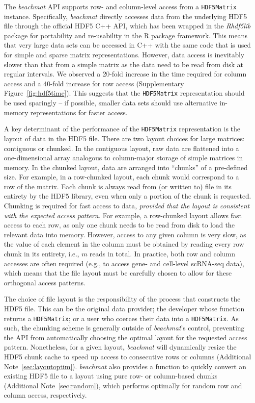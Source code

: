 \documentclass{article}
\newcommand{\beachmat}{\textit{beachmat}}
\newcommand{\code}[1]{\texttt{#1}}
\begin{document}
The \beachmat{} API supports row- and column-level access from a \code{HDF5Matrix} instance.
Specifically, \beachmat{} directly accesses data from the underlying HDF5 file through the official HDF5 C++ API, which has been wrapped in the \textit{Rhdf5lib} package for portability and re-usability in the R package framework.
This means that very large data sets can be accessed in C++ with the same code that is used for simple and sparse matrix representations.
However, data access is inevitably slower than that from a simple matrix as the data need to be read from disk at regular intervals.
We observed a 20-fold increase in the time required for column access and a 40-fold increase for row access (Supplementary Figure~\ref{fig:hdf5time}).
This suggests that the \code{HDF5Matrix} representation should be used sparingly -- if possible, smaller data sets should use alternative in-memory representations for faster access.

A key determinant of the performance of the \code{HDF5Matrix} representation is the layout of data in the HDF5 file.
There are two layout choices for large matrices: contiguous or chunked.
In the contiguous layout, raw data are flattened into a one-dimensional array analogous to column-major storage of simple matrices in memory.
In the chunked layout, data are arranged into ``chunks'' of a pre-defined size.
For example, in a row-chunked layout, each chunk would correspond to a row of the matrix.
Each chunk is always read from (or written to) file in its entirety by the HDF5 library, even when only a portion of the chunk is requested.
Chunking is required for fast access to data, \textit{provided that the layout is consistent with the expected access pattern}.
For example, a row-chunked layout allows fast access to each row, as only one chunk needs to be read from disk to load the relevant data into memory.
However, access to any given column is very slow, as the value of each element in the column must be obtained by reading every row chunk in its entirety, i.e., $m$ reads in total.
In practice, both row and column accesses are often required (e.g., to access gene- and cell-level scRNA-seq data), which means that the file layout must be carefully chosen to allow for these orthogonal access patterns.

The choice of file layout is the responsibility of the process that constructs the HDF5 file.
This can be the original data provider; the developer whose function returns a \code{HDF5Matrix}; or a user who coerces their data into a \code{HDF5Matrix}.
As such, the chunking scheme is generally outside of \beachmat{}'s control, preventing the API from automatically choosing the optimal layout for the requested access pattern.
Nonetheless, for a given layout, \beachmat{} will dynamically resize the HDF5 chunk cache to speed up access to consecutive rows or columns (Additional Note~\ref{sec:layoutoptim}).
\beachmat{} also provides a function to quickly convert an existing HDF5 file to a layout using pure row- or column-based chunks (Additional Note~\ref{sec:random}), which performs optimally for random row and column access, respectively.
\end{document}
